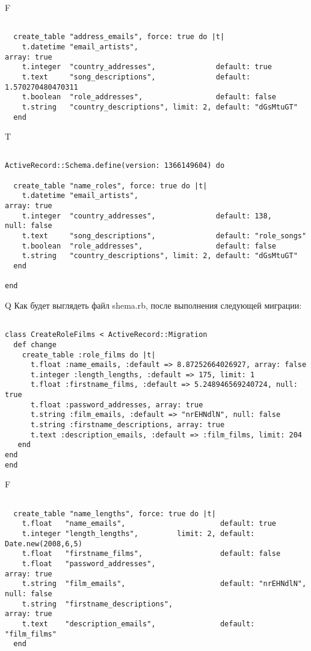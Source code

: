 F
\begin{verbatim}

  create_table "address_emails", force: true do |t|
    t.datetime "email_artists",                                                      array: true
    t.integer  "country_addresses",              default: true
    t.text     "song_descriptions",              default: 1.570270480470311
    t.boolean  "role_addresses",                 default: false
    t.string   "country_descriptions", limit: 2, default: "dGsMtuGT"
  end

\end{verbatim}

T
\begin{verbatim}

ActiveRecord::Schema.define(version: 1366149604) do

  create_table "name_roles", force: true do |t|
    t.datetime "email_artists",                                                      array: true
    t.integer  "country_addresses",              default: 138,          null: false
    t.text     "song_descriptions",              default: "role_songs"
    t.boolean  "role_addresses",                 default: false
    t.string   "country_descriptions", limit: 2, default: "dGsMtuGT"
  end

end
\end{verbatim}

Q
Как будет выглядеть файл shema.rb, после выполнения следующей миграции:

\begin{verbatim}

class CreateRoleFilms < ActiveRecord::Migration 
  def change 
    create_table :role_films do |t| 
      t.float :name_emails, :default => 8.87252664026927, array: false
      t.integer :length_lengths, :default => 175, limit: 1
      t.float :firstname_films, :default => 5.248946569240724, null: true
      t.float :password_addresses, array: true
      t.string :film_emails, :default => "nrEHNdlN", null: false
      t.string :firstname_descriptions, array: true
      t.text :description_emails, :default => :film_films, limit: 204
   end
end
end
\end{verbatim}

F
\begin{verbatim}

  create_table "name_lengths", force: true do |t|
    t.float   "name_emails",                      default: true
    t.integer "length_lengths",         limit: 2, default: Date.new(2008,6,5)
    t.float   "firstname_films",                  default: false
    t.float   "password_addresses",                                                        array: true
    t.string  "film_emails",                      default: "nrEHNdlN",        null: false
    t.string  "firstname_descriptions",                                                    array: true
    t.text    "description_emails",               default: "film_films"
  end

\end{verbatim}

